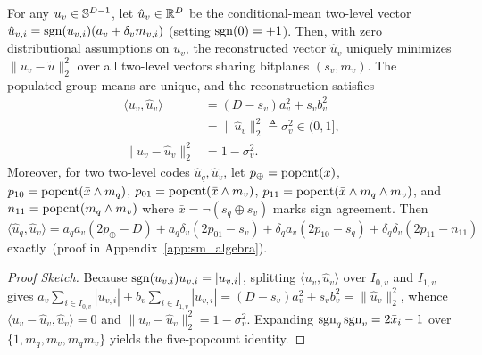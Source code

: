 \begin{lemma}
\label{lem:sm_pythagorean}
For any $u_v \in \mathbb{S}^{D-1}$, let $\hat{u}_v \in \mathbb{R}^D$ be the conditional-mean two-level vector $\hat{u}_{v,i} = \operatorname{sgn}(u_{v,i})(a_v + \delta_v m_{v,i})$ (setting $\operatorname{sgn}(0) = +1$).
Then, with zero distributional assumptions on $u_v$, the reconstructed vector $\hat u_v$ uniquely minimizes $\|u_v - \tilde{u}\|_2^2$ over all two-level vectors sharing bitplanes $(s_v,m_v)$. The populated-group means are unique, and the reconstruction satisfies
\begin{equation}
  \begin{aligned}
    \langle u_v, \hat{u}_v\rangle &= (D - s_v)a_v^2 + s_v b_v^2 \\
    &= \|\hat{u}_v\|_2^2 \triangleq \sigma_v^2 \in (0, 1], \\
    \|u_v - \hat{u}_v\|_2^2 &= 1 - \sigma_v^2.
  \end{aligned}
  \label{eq:sm_pythagorean}
\end{equation}
Moreover, for two two-level codes $\hat{u}_q, \hat{u}_v$, let $p_{\oplus} = \operatorname{popcnt}(\bar{x})$, $p_{10} = \operatorname{popcnt}(\bar{x} \wedge m_q)$, $p_{01} = \operatorname{popcnt}(\bar{x} \wedge m_v)$, $p_{11} = \operatorname{popcnt}(\bar{x} \wedge m_q \wedge m_v)$, and $n_{11} = \operatorname{popcnt}(m_q \wedge m_v)$ where $\bar{x} = \neg(s_q \oplus s_v)$ marks sign agreement.
Then $\langle \hat{u}_q, \hat{u}_v\rangle = a_q a_v(2 p_{\oplus} - D) + a_q \delta_v(2 p_{01} - s_v) + \delta_q a_v(2 p_{10} - s_q) + \delta_q \delta_v(2 p_{11} - n_{11})$ exactly\ifpreprint\ (proof in Appendix~\ref{app:sm_algebra})\fi.
\end{lemma}

\begin{proof}[Proof Sketch]
Because $\operatorname{sgn}(u_{v,i}) u_{v,i} = |u_{v,i}|$, splitting $\langle u_v, \hat{u}_v\rangle$ over $I_{0,v}$ and $I_{1,v}$ gives $a_v \sum_{i \in I_{0,v}} |u_{v,i}| + b_v \sum_{i \in I_{1,v}} |u_{v,i}| = (D - s_v)a_v^2 + s_v b_v^2 = \|\hat{u}_v\|_2^2$, whence $\langle u_v - \hat{u}_v, \hat{u}_v\rangle = 0$ and $\|u_v - \hat{u}_v\|_2^2 = 1 - \sigma_v^2$.
Expanding $\operatorname{sgn}_q \operatorname{sgn}_v = 2\bar{x}_i - 1$ over $\{1, m_q, m_v, m_q m_v\}$ yields the five-popcount identity.
\end{proof}

